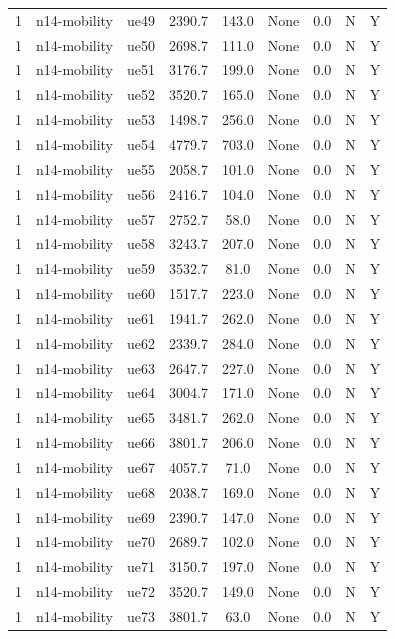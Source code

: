 \begin{table}[ht]
\begin{tabular}{|c|c|c|c|c|c|c|c|c|}
1 & n14-mobility & ue49 & 2390.7 & 143.0 & None & 0.0 & N & Y \\
1 & n14-mobility & ue50 & 2698.7 & 111.0 & None & 0.0 & N & Y \\
1 & n14-mobility & ue51 & 3176.7 & 199.0 & None & 0.0 & N & Y \\
1 & n14-mobility & ue52 & 3520.7 & 165.0 & None & 0.0 & N & Y \\
1 & n14-mobility & ue53 & 1498.7 & 256.0 & None & 0.0 & N & Y \\
1 & n14-mobility & ue54 & 4779.7 & 703.0 & None & 0.0 & N & Y \\
1 & n14-mobility & ue55 & 2058.7 & 101.0 & None & 0.0 & N & Y \\
1 & n14-mobility & ue56 & 2416.7 & 104.0 & None & 0.0 & N & Y \\
1 & n14-mobility & ue57 & 2752.7 & 58.0 & None & 0.0 & N & Y \\
1 & n14-mobility & ue58 & 3243.7 & 207.0 & None & 0.0 & N & Y \\
1 & n14-mobility & ue59 & 3532.7 & 81.0 & None & 0.0 & N & Y \\
1 & n14-mobility & ue60 & 1517.7 & 223.0 & None & 0.0 & N & Y \\
1 & n14-mobility & ue61 & 1941.7 & 262.0 & None & 0.0 & N & Y \\
1 & n14-mobility & ue62 & 2339.7 & 284.0 & None & 0.0 & N & Y \\
1 & n14-mobility & ue63 & 2647.7 & 227.0 & None & 0.0 & N & Y \\
1 & n14-mobility & ue64 & 3004.7 & 171.0 & None & 0.0 & N & Y \\
1 & n14-mobility & ue65 & 3481.7 & 262.0 & None & 0.0 & N & Y \\
1 & n14-mobility & ue66 & 3801.7 & 206.0 & None & 0.0 & N & Y \\
1 & n14-mobility & ue67 & 4057.7 & 71.0 & None & 0.0 & N & Y \\
1 & n14-mobility & ue68 & 2038.7 & 169.0 & None & 0.0 & N & Y \\
1 & n14-mobility & ue69 & 2390.7 & 147.0 & None & 0.0 & N & Y \\
1 & n14-mobility & ue70 & 2689.7 & 102.0 & None & 0.0 & N & Y \\
1 & n14-mobility & ue71 & 3150.7 & 197.0 & None & 0.0 & N & Y \\
1 & n14-mobility & ue72 & 3520.7 & 149.0 & None & 0.0 & N & Y \\
1 & n14-mobility & ue73 & 3801.7 & 63.0 & None & 0.0 & N & Y \\

\end{tabular}
\end{table}
